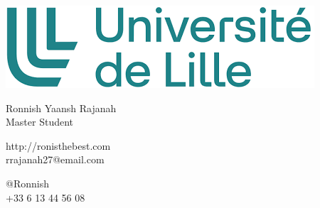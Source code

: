 \documentclass{article}
\begin{document}
\centering \includegraphics[width=.25\linewidth]{University logo}\\[5pt]
\parbox{2in}{\Large \centering Ronnish Yaansh Rajanah\\[1pt]
\normalsize Master Student}

\vfill
\raggedright
\begin{multicols}{2}
http://ronisthebest.com\\
rrajanah27@email.com

\columnbreak
\raggedleft
\small
@Ronnish\\
+33 6 13 44 56 08%
\end{multicols}%
\end{document}
